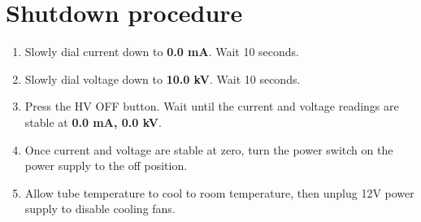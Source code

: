 \section{Shutdown procedure\label{sec:shutdown}}

\begin{enumerate}

\item Slowly dial current down to \textbf{0.0 mA}. Wait 10 seconds.

\item Slowly dial voltage down to \textbf{10.0 kV}. Wait 10 seconds.

\item Press the HV OFF button. Wait until the current and voltage readings are
  stable at \textbf{0.0 mA, 0.0 kV}.

\item Once current and voltage are stable at zero, turn the power switch on the
  power supply to the off position.

\item Allow tube temperature to cool to room temperature, then unplug 12V power
  supply to disable cooling fans.

\end{enumerate}
